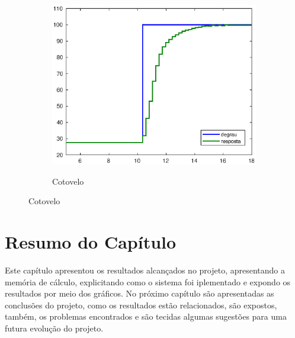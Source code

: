 \begin{figure}[h!]
\begin{subfigure}{.5\textwidth}
    \label{fig:shoulder_hilFase3}
  \end{subfigure}%
  \\
  \begin{subfigure}{\textwidth}
    \centering
    \caption{Cotovelo}
    \includegraphics[width = 0.5\columnwidth]{Imagens/forearm_hilFase3}
    \label{fig:forearm_hilFase3}
  \end{subfigure}%
  
  \label{fig:hilFase3} 

\end{figure}

\section{Resumo do Capítulo}

Este capítulo apresentou os resultados alcançados no projeto, apresentando a memória de cálculo,
explicitando como o sistema foi iplementado e expondo os resultados por meio dos gráficos. No próximo
capítulo são apresentadas as conclusões do projeto, como os resultados estão relacionados, são expostos, também, 
os problemas encontrados e são tecidas algumas sugestões para uma futura evolução do projeto.


\clearpage